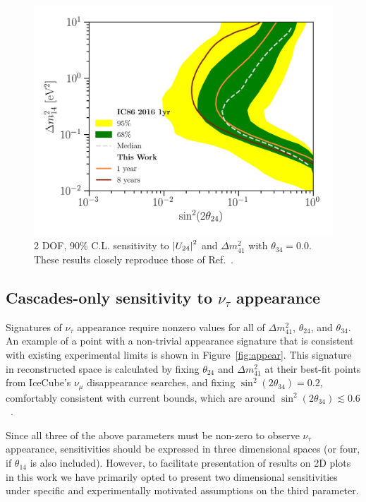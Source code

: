 \documentclass[main.tex]{subfiles}
\begin{document}
\begin{figure}
    \centering
    \includegraphics[width=0.85\linewidth]{figures/meows_sensitivity.png}
    \caption{2 DOF, 90\% C.L. sensitivity to $\left| U_{24} \right|^{2}$ and $\Delta m_{41}^{2}$ with $\theta_{34}=0.0$. These results closely reproduce those of Ref.~\cite{Aartsen_2020_prd}.}\label{fig:meowssense}
\end{figure}

\subsection{\label{sec:cascadesens} Cascades-only sensitivity to $\nu_{\tau}$ appearance}

Signatures of $\nu_{\tau}$ appearance require nonzero values for all of  $\Delta m_{41}^{2}$, $\theta_{24}$, and $\theta_{34}$.  An example of a point with a non-trivial appearance signature that is consistent with existing experimental limits is shown in Figure~\ref{fig:appear}. This signature in reconstructed space is calculated by fixing $\theta_{24}$ and $\Delta m^2_{41}$ at their best-fit points from IceCube's $\nu_\mu$ disappearance searches, and fixing $\sin^{2}(2\theta_{34})=0.2$, comfortably consistent with current bounds, which are around $\sin^{2}(2\theta_{34})\lesssim 0.6$~\cite{Aartsen_2017_dc, Adamson_2011}.

Since all three of the above parameters must be non-zero to observe $\nu_\tau$ appearance, sensitivities should be expressed in three dimensional spaces (or four, if $\theta_{14}$ is also included). However, to facilitate  presentation of results on 2D plots in this work we have primarily opted to present two dimensional sensitivities under specific and experimentally motivated assumptions on the third parameter. 
\end{document}
